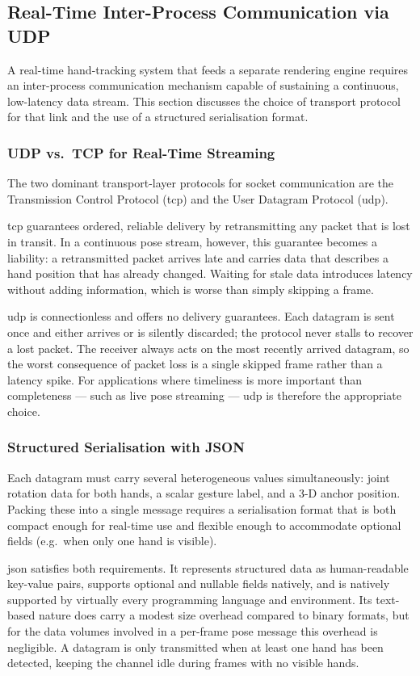 \subsection{Real-Time Inter-Process Communication via UDP}\label{subsec:udp}

A real-time hand-tracking system that feeds a separate rendering
engine requires an inter-process communication mechanism capable of
sustaining a continuous, low-latency data stream.
This section discusses the choice of transport protocol for that link and
the use of a structured serialisation format.

\subsubsection{UDP vs.\ TCP for Real-Time Streaming}

The two dominant transport-layer protocols for socket communication
are the Transmission Control Protocol (\acrshort{tcp}) and the User
Datagram Protocol (\acrshort{udp}).

\acrshort{tcp} guarantees ordered, reliable delivery by
retransmitting any packet that is lost in transit.
In a continuous pose stream, however, this guarantee becomes
a liability: a retransmitted packet arrives late and carries data
that describes a hand position that has already changed.
Waiting for stale data introduces latency without adding information,
which is worse than simply skipping a frame.

\acrshort{udp} is connectionless and offers no delivery guarantees.
Each datagram is sent once and either arrives or is silently
discarded; the protocol never stalls to recover a lost packet.
The receiver always acts on the most recently arrived datagram,
so the worst consequence of packet loss is a single skipped frame
rather than a latency spike.
For applications where timeliness is more important than completeness
--- such as live pose streaming --- \acrshort{udp} is therefore the
appropriate choice.

\subsubsection{Structured Serialisation with JSON}

Each datagram must carry several heterogeneous values simultaneously:
joint rotation data for both hands, a scalar gesture label, and a
3-D anchor position.
Packing these into a single message requires a serialisation format
that is both compact enough for real-time use and flexible enough to
accommodate optional fields (e.g.\ when only one hand is visible).

\acrshort{json} satisfies both requirements.
It represents structured data as human-readable key-value pairs,
supports optional and nullable fields natively, and is natively
supported by virtually every programming language and environment.
Its text-based nature does carry a modest size overhead compared to
binary formats, but for the data volumes involved in a per-frame pose
message this overhead is negligible.
A datagram is only transmitted when at least one hand has been
detected, keeping the channel idle during frames with no visible
hands.
